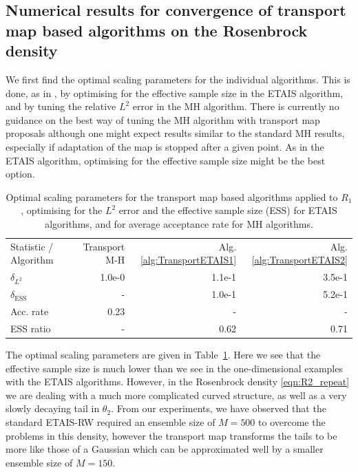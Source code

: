 \documentclass[final]{siamltex}
\begin{document}
\subsection[Numerical results]{Numerical results for convergence of
  transport map based algorithms on the Rosenbrock density}

We first find the optimal scaling parameters for the individual
algorithms. This is done, as in \cite{cotter2015parallel}, by optimising for the effective sample size in
the ETAIS algorithm, and by tuning the relative $L^2$ error in the MH
algorithm. There is currently no
guidance on the best way of tuning the MH algorithm with transport map
proposals although one might expect results similar to the standard MH
results, especially if adaptation of the map is stopped after a given
point. As in the ETAIS algorithm, optimising for the effective sample size might be the best option.

\begin{table}[!ht]
\centering
\begin{tabular}{lrrr}
\toprule
	Statistic \quad / \quad Algorithm & Transport M-H &
                                                            Alg. \ref{alg:TransportETAIS1} & Alg. \ref{alg:TransportETAIS2}  \\ \cmidrule(lr){1-4}
	$\delta_{L^2}$				 & 1.0e-0 & 1.1e-1 & 3.5e-1 \\
	$\delta_{\text{ESS}}$				 & - & 1.0e-1 & 5.2e-1 \\ \cmidrule(lr){1-4}
	Acc. rate							 & 0.23 & - & - \\
	ESS ratio							 & - & 0.62 & 0.71 \\
\bottomrule
\end{tabular}
\caption{Optimal scaling parameters for the transport map based
  algorithms applied to $R_1$, optimising for the $L^2$ error and
  the effective sample size (ESS) for ETAIS algorithms, and for average
  acceptance rate for MH algorithms.}
\label{tab:R2_opt_scaling}
\end{table}

The optimal scaling parameters are given in
Table~\ref{tab:R2_opt_scaling}. Here we see that the effective sample
size is much lower than we see in the one-dimensional examples with
the ETAIS algorithms. However, in the Rosenbrock density
\eqref{eqn:R2_repeat} we are dealing with a much more complicated
curved structure, as well as a very slowly decaying tail in
$\theta_2$. From our experiments, we have observed that the standard ETAIS-RW required an ensemble size of $M=500$ to overcome the problems in this density, however the transport map transforms the tails to be more like those of a Gaussian which can be approximated well by a smaller ensemble size of $M=150$.
\end{document}
